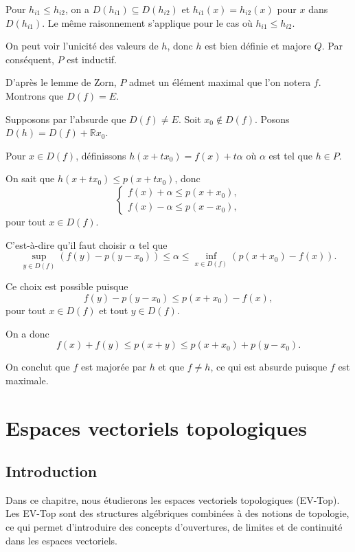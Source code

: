 \documentclass{article}
\theoremstyle{definition}
\theoremstyle{plain}
\begin{document}
Pour  $h_{i1} \leq h_{i2}$, on a $D(h_{i1}) \subseteq D(h_{i2})$ et $h_{i1}(x) = h_{i2}(x)$ pour $x$ dans $D(h_{i1})$. Le même raisonnement s'applique pour le cas où $h_{i1} \leq h_{i2}$.

On peut voir l'unicité des valeurs de $h$, donc $h$ est bien définie et majore $Q$. Par conséquent, $P$ est inductif.

D'après le lemme de Zorn, $P$ admet un élément maximal que l'on notera $f$. Montrons que $D(f) = E$.

Supposons par l'absurde que $D(f) \neq E$. Soit $x_0 \notin D(f)$. Posons $D(h) = D(f) + \mathbb{R}x_0$.

Pour $x \in D(f)$, définissons $h(x + t x_0) = f(x) + t \alpha$ où $\alpha$ est tel que $h \in P$.

On sait que $h(x + t x_0) \leq p(x + t x_0)$, donc
\[
\begin{cases}
    f(x) + \alpha \leq p(x + x_0), \\
    f(x) - \alpha \leq p(x - x_0),
\end{cases}
\]
pour tout $x \in D(f)$.



C'est-à-dire qu'il faut choisir $\alpha$ tel que 
\[
\sup_{y \in D(f)} (f(y) - p(y - x_0)) \leq \alpha \leq \inf_{x \in D(f)} (p(x + x_0) - f(x)).
\]

Ce choix est possible puisque 
\[
f(y) - p(y - x_0) \leq p(x+x_0) - f(x),
\]
pour tout $x \in D(f)$ et tout $y \in D(f)$.

On a donc 
\[
f(x) + f(y) \leq p(x+y) \leq p(x+x_0) + p(y - x_0).
\]

On conclut que $f$ est majorée par $h$ et que $f \neq h$, ce qui est absurde puisque $f$ est maximale.

\section{Espaces vectoriels topologiques}
\subsection{Introduction}
Dans ce chapitre, nous étudierons les espaces vectoriels topologiques (EV-Top). Les EV-Top sont des structures algébriques combinées à des notions de topologie, ce qui permet d'introduire des concepts d'ouvertures, de limites et de continuité dans les espaces vectoriels.
\end{document}
